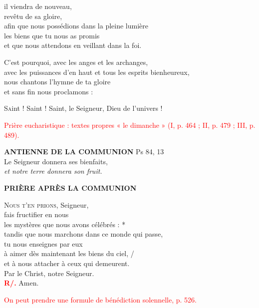 \documentclass[12pt]{article}
\begin{document}
\vspace{0.5em}
il viendra de nouveau,\\
\hspace*{1em} revêtu de sa gloire,\\
\hspace*{1em} afin que nous possédions dans la pleine lumière\\
\hspace*{1em} les biens que tu nous as promis\\
\hspace*{1em} et que nous attendons en veillant dans la foi.

\vspace{0.5em}
C’est pourquoi, avec les anges et les archanges,\\
\hspace*{1em} avec les puissances d’en haut et tous les esprits bienheureux,\\
\hspace*{1em} nous chantons l’hymne de ta gloire\\
\hspace*{1em} et sans fin nous proclamons :

\vspace{0.5em}
\lettrine[lines=2, lhang=0.1, loversize=0.2, findent=0pt, nindent=0pt]{\color{red}S}aint ! Saint ! Saint, le Seigneur, Dieu de l’univers !

\vspace{2em}
{\small \textcolor{red}{Prière eucharistique : textes propres « le dimanche » (I, p. 464 ; II, p. 479 ; III, p. 489).}}

\vspace{0.5em}
\textbf{\textcolor{rougeliturgique}{ANTIENNE DE LA COMMUNION}} \textnormal{Ps 84, 13}\\
Le Seigneur donnera ses bienfaits,\\
\textit{et notre terre donnera son fruit.}

\vspace{1em}
\textbf{\textcolor{rougeliturgique}{PRIÈRE APRÈS LA COMMUNION}}

\lettrine[lines=2, lhang=0.1, loversize=0.2, findent=0pt, nindent=0pt]{\color{red}N}{ous t’en prions}, Seigneur,\\
fais fructifier en nous\\
les mystères que nous avons célébrés : *\\
tandis que nous marchons dans ce monde qui passe,\\
tu nous enseignes par eux\\
\hspace*{1em} à aimer dès maintenant les biens du ciel, /\\
\hspace*{1em} et à nous attacher à ceux qui demeurent.\\
Par le Christ, notre Seigneur.\\
\textbf{\textcolor{red}{R/.}} Amen.

\vspace{0.5em}
\textcolor{red}{\small On peut prendre une formule de bénédiction solennelle, p. 526.}
\end{document}
